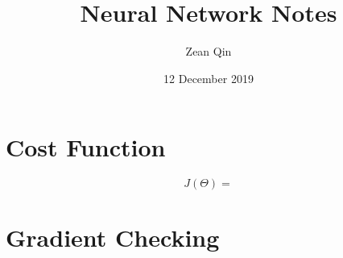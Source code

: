 \documentclass[10pt]{article}
\title{Neural Network Notes}
\author{Zean Qin}
\date{12 December 2019}
\begin{document}
\maketitle
\tableofcontents


\section{Cost Function}

\begin{equation}
    J(\Theta) = 
\end{equation}



\section{Gradient Checking}
\end{document}
